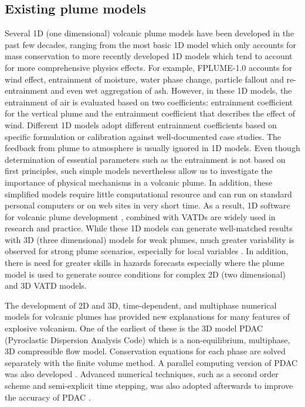 \documentclass[journal abbreviation, manuscript]{copernicus}
\begin{document}
\subsection{Existing plume models}
Several 1D (one dimensional) volcanic plume models have been developed in the past few decades, ranging from the most basic 1D model \citep{woods1988fluid} which only accounts for mass conservation to more recently developed 1D models  \citep{bursik2001effect, mastin2007user, degruyter2012improving, woodhouse2013interaction, devenish2013using, de2015plume, folch2016fplume, pouget2016sensitivity} which tend to account for more comprehensive physics effects. 
For example, FPLUME-1.0 \citep{folch2016fplume} accounts for wind effect, entrainment of moisture, water phase change, particle fallout and re-entrainment and even wet aggregation of ash. However, in these 1D models, the entrainment of air is evaluated based on two coefficients: entrainment coefficient for the vertical plume and the entrainment coefficient that describes the effect of wind. Different 1D models adopt different entrainment coefficients based on specific formulation or calibration against well-documented case studies. The feedback from plume to atmosphere is usually ignored in 1D models. Even though determination of essential parameters such as the entrainment is not based on first principles, such simple models nevertheless allow us to investigate the importance of physical mechanisms in a volcanic plume. In addition, these simplified models require little computational resource and can run on standard personal computers or on web sites in very short time. As a result, 1D software for volcanic plume development \citep[such as][]{267, 1194, 3541}, combined with VATDs \citep[such as][]{114, draxler2015hysplit} are widely used in research and practice. While these 1D models can generate well-matched results with 3D (three dimensional) models for weak plumes, much greater variability is observed for strong plume scenarios, especially for local variables \citep{costa2016results}. In addition, there is need for greater skills in hazards forecasts especially where the plume model is used to generate source conditions for complex 2D (two dimensional) and 3D VATD models.

The development of 2D and 3D, time-dependent, and multiphase numerical models for volcanic plumes has provided new explanations for many features of explosive volcanism. One of the earliest of these is the 3D model PDAC (Pyroclastic Dispersion Analysis Code) \citep{neri2003multiparticle}  which is a non-equilibrium, multiphase, 3D compressible flow model. Conservation equations for each phase are solved separately with the finite volume method. A parallel computing version of PDAC was also developed \citep{ongaro2007parallel}. Advanced numerical techniques, such as a second order scheme and semi-explicit time stepping, was also adopted afterwards to improve the accuracy of PDAC \citep{carcano2013semi}. 
\end{document}
